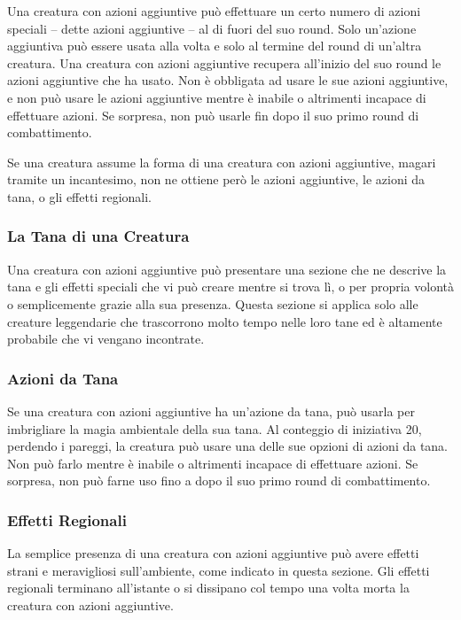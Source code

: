 Una creatura con azioni aggiuntive può effettuare un certo  numero di azioni speciali -- dette azioni aggiuntive -- al  di fuori del suo round. Solo un'azione aggiuntiva può  essere usata alla volta e solo al termine del round di  un'altra creatura. Una creatura con azioni aggiuntive recupera  all'inizio del suo round le azioni aggiuntive che ha  usato. Non è obbligata ad usare le sue azioni aggiuntive, e non può usare le azioni aggiuntive mentre è inabile o altrimenti incapace di effettuare  azioni. Se sorpresa, non può usarle fin dopo il suo  primo round di combattimento.

Se una creatura assume la forma di una creatura con azioni aggiuntive, magari tramite un incantesimo, non ne  ottiene però le azioni aggiuntive, le azioni da tana, o  gli effetti regionali.

\subsubsection{La Tana di una Creatura}

Una creatura con azioni aggiuntive può presentare una sezione che ne descrive la tana e gli effetti speciali che vi può  creare mentre si trova lì, o per propria volontà o  semplicemente grazie alla sua presenza. Questa  sezione si applica solo alle creature leggendarie che  trascorrono molto tempo nelle loro tane ed è altamente  probabile che vi vengano incontrate.

\subsubsection{Azioni da Tana}

Se una creatura con azioni aggiuntive ha un'azione da tana, può  usarla per imbrigliare la magia ambientale della sua  tana. Al conteggio di iniziativa 20, perdendo i pareggi,  la creatura può usare una delle sue opzioni di azioni da  tana. Non può farlo mentre è inabile o altrimenti  incapace di effettuare azioni. Se sorpresa, non può  farne uso fino a dopo il suo primo round di combattimento.

\subsubsection{Effetti Regionali}

La semplice presenza di una creatura con azioni aggiuntive può  avere effetti strani e meravigliosi sull'ambiente, come  indicato in questa sezione. Gli effetti regionali terminano all'istante o si dissipano col tempo una volta  morta la creatura con azioni aggiuntive.

